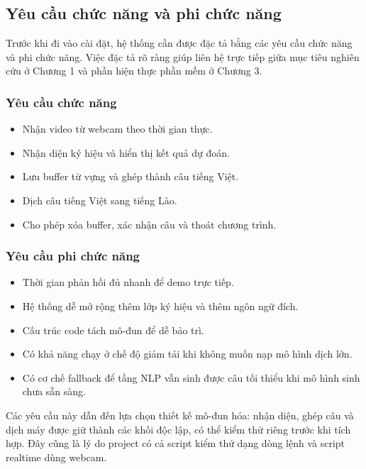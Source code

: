 ﻿\subsection{Yêu cầu chức năng và phi chức năng}

Trước khi đi vào cài đặt, hệ thống cần được đặc tả bằng các yêu cầu chức năng và phi chức năng. Việc đặc tả rõ ràng giúp liên hệ trực tiếp giữa mục tiêu nghiên cứu ở Chương 1 và phần hiện thực phần mềm ở Chương 3.

\subsubsection{Yêu cầu chức năng}
\begin{itemize}
    \item Nhận video từ webcam theo thời gian thực.
    \item Nhận diện ký hiệu và hiển thị kết quả dự đoán.
    \item Lưu buffer từ vựng và ghép thành câu tiếng Việt.
    \item Dịch câu tiếng Việt sang tiếng Lào.
    \item Cho phép xóa buffer, xác nhận câu và thoát chương trình.
\end{itemize}

\subsubsection{Yêu cầu phi chức năng}
\begin{itemize}
    \item Thời gian phản hồi đủ nhanh để demo trực tiếp.
    \item Hệ thống dễ mở rộng thêm lớp ký hiệu và thêm ngôn ngữ đích.
    \item Cấu trúc code tách mô-đun để dễ bảo trì.
    \item Có khả năng chạy ở chế độ giảm tải khi không muốn nạp mô hình dịch lớn.
    \item Có cơ chế fallback để tầng NLP vẫn sinh được câu tối thiểu khi mô hình sinh chưa sẵn sàng.
\end{itemize}

Các yêu cầu này dẫn đến lựa chọn thiết kế mô-đun hóa: nhận diện, ghép câu và dịch máy được giữ thành các khối độc lập, có thể kiểm thử riêng trước khi tích hợp. Đây cũng là lý do project có cả script kiểm thử dạng dòng lệnh và script realtime dùng webcam.

